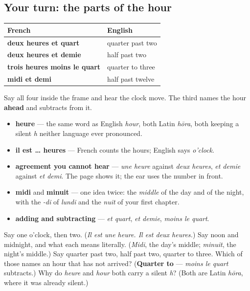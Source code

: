 \subsection*{Your turn: the parts of the hour}
\noindent
\begin{tabularx}{\linewidth}{@{}>{\raggedright\arraybackslash}X>{\raggedright\arraybackslash}X@{}}
\toprule
\textbf{French} & \textbf{English} \\
\midrule
\textbf{deux heures et quart} & quarter past two \\
\textbf{deux heures et demie} & half past two \\
\textbf{trois heures moins le quart} & quarter to three \\
\textbf{midi et demi} & half past twelve \\
\bottomrule
\end{tabularx}

Say all four inside the frame and hear the clock move. The third names the hour \textbf{ahead} and subtracts from it.

\begin{grammarlens}[title={What you've built this chapter}]
\begin{itemize}
\raggedright
  \item \textbf{heure} — the same word as English \emph{hour}, both Latin \emph{hōra}, both keeping a silent \emph{h} neither language ever pronounced.
  \item \textbf{il est … heures} — French counts the hours; English says \emph{o'clock}.
  \item \textbf{agreement you cannot hear} — \emph{une heure} against \emph{deux heures}, \emph{et demie} against \emph{et demi}. The page shows it; the ear uses the number in front.
  \item \textbf{midi} and \textbf{minuit} — one idea twice: the \emph{middle} of the day and of the night, with the \emph{-di} of \emph{lundi} and the \emph{nuit} of your first chapter.
  \item \textbf{adding and subtracting} — \emph{et quart}, \emph{et demie}, \emph{moins le quart}.
\end{itemize}
\end{grammarlens}

\begin{tcolorbox}[breakable,colback=teal!4,colframe=teal!35!black,title={Before you move on}]
Say one o'clock, then two. (\emph{Il est une heure. Il est deux heures.}) Say noon and midnight, and what each means literally. (\emph{Midi}, the day's middle; \emph{minuit}, the night's middle.) Say quarter past two, half past two, quarter to three. Which of those names an hour that has not arrived? (\textbf{Quarter to} — \emph{moins le quart} subtracts.) Why do \emph{heure} and \emph{hour} both carry a silent \emph{h}? (Both are Latin \emph{hōra}, where it was already silent.)
\end{tcolorbox}
